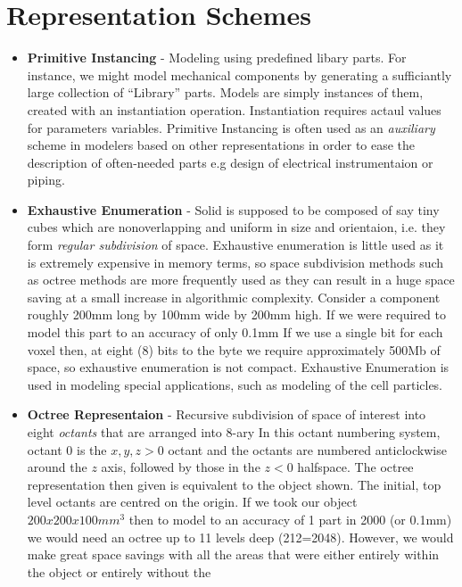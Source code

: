 \documentclass[12pt,a4paper,openbib]{article}
\begin{document}
\section{Representation Schemes}
	\begin{itemize}
		\item {\bf Primitive Instancing} - Modeling using predefined libary 
			parts. For instance, we might model mechanical components by
			generating a sufficiantly large collection of ``Library'' parts.
			Models are simply instances of them, created with an
			instantiation operation. Instantiation requires actaul values 
			for parameters variables. Primitive Instancing is often used as
			an {\it auxiliary} scheme in modelers based on other
			representations in order to ease the description of often-needed
			parts e.g design of electrical instrumentaion or piping.
		\item {\bf Exhaustive Enumeration} - Solid is supposed to be composed
			of say tiny cubes which are nonoverlapping and uniform in size and
			orientaion, i.e. they form {\em regular subdivision} of space.
			Exhaustive enumeration is little used as it is extremely expensive 
			in memory terms, so space subdivision methods such as octree 
			methods are more frequently used as they can result in a huge 
			space saving at a small increase in algorithmic complexity. 
			Consider a component roughly 200mm long by 100mm wide by 200mm high.
		 	If we were required to model this part to an accuracy of only 0.1mm 			If we use a single bit for each voxel then, at eight (8) bits to 
			the byte we require approximately 500Mb of space, 
			so exhaustive enumeration is not compact.
			Exhaustive Enumeration is used in modeling special applications,
			such as modeling of the cell particles. 
		\item {\bf Octree Representaion} - Recursive subdivision of space of
			interest into eight {\em octants} that are arranged into 8-ary
			In this octant numbering system, octant 0 is the $x,y,z>0$ octant 
			and the octants are numbered anticlockwise around the $z$ axis,
			followed by those in the $z<0$ halfspace. The octree representation 			then given is equivalent to the object shown. The initial, top 
			level octants are centred on the origin. 
			If we took our object $200x200x100 mm^{3}$ then to model to an 
			accuracy of 1 part in 2000 (or 0.1mm) we would need an octree up 
			to 11 levels deep (212=2048). 
			However, we would make great space savings with all the areas that 
			were either entirely within the object or entirely without the 

\end{itemize}
\end{document}
